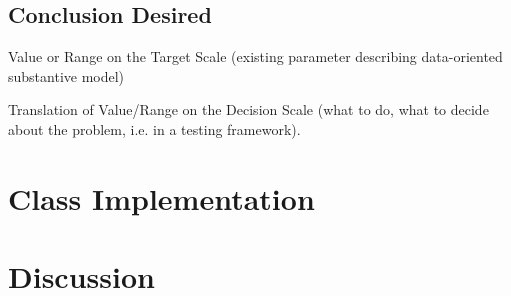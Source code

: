 \documentclass{article}
\begin{document}
\subsection{Conclusion Desired}
\label{sec:component:conclusion}

Value or Range on the Target Scale (existing parameter describing
data-oriented substantive model)

Translation of Value/Range on the Decision Scale (what to do, what to
decide about the problem, i.e. in a testing framework).

\section{Class Implementation}
\label{sec:class}


\section{Discussion}
\label{sec:disc}
\end{document}
